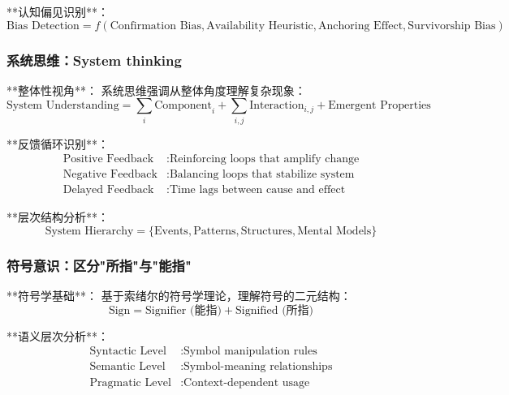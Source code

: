 **认知偏见识别**：
\begin{equation}
\text{Bias Detection} = f(\text{Confirmation Bias}, \text{Availability Heuristic}, \text{Anchoring Effect}, \text{Survivorship Bias})
\end{equation}

\subsubsection{系统思维：System thinking} %

**整体性视角**：
系统思维强调从整体角度理解复杂现象：
\begin{equation}
\text{System Understanding} = \sum_{i} \text{Component}_i + \sum_{i,j} \text{Interaction}_{i,j} + \text{Emergent Properties}
\end{equation}

**反馈循环识别**：
\begin{align}
\text{Positive Feedback} &: \text{Reinforcing loops that amplify change} \\
\text{Negative Feedback} &: \text{Balancing loops that stabilize system} \\
\text{Delayed Feedback} &: \text{Time lags between cause and effect}
\end{align}

**层次结构分析**：
\begin{equation}
\text{System Hierarchy} = \{\text{Events}, \text{Patterns}, \text{Structures}, \text{Mental Models}\}
\end{equation}

\subsubsection{符号意识：区分"所指"与"能指"} %

**符号学基础**：
基于索绪尔的符号学理论，理解符号的二元结构：
\begin{equation}
\text{Sign} = \text{Signifier (能指)} + \text{Signified (所指)}
\end{equation}

**语义层次分析**：
\begin{align}
\text{Syntactic Level} &: \text{Symbol manipulation rules} \\
\text{Semantic Level} &: \text{Symbol-meaning relationships} \\
\text{Pragmatic Level} &: \text{Context-dependent usage}
\end{align}

